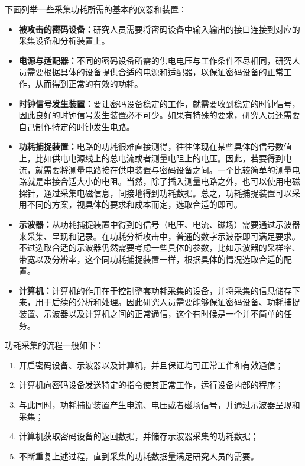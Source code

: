 下面列举一些采集功耗所需的基本的仪器和装置： \cite{paa_cn}

\begin{itemize}
\item \textbf{被攻击的密码设备：}研究人员需要将密码设备中输入输出的接口连接到对应的采集设备和分析装置上。
\item \textbf{电源与适配器：}不同的密码设备所需的供电电压与工作条件不尽相同，研究人员需要根据具体的设备提供合适的电源和适配器，以保证密码设备的正常工作，从而得到正常的有效的功耗。
\item \textbf{时钟信号发生装置：}要让密码设备稳定的工作，就需要收到稳定的时钟信号，因此良好的时钟信号发生装置必不可少。如果有特殊的要求，研究人员还需要自己制作特定的时钟发生电路。
\item \textbf{功耗捕捉装置：}电路的功耗很难直接测得，往往体现在某些具体的信号数值上，比如供电电源线上的总电流或者测量电阻上的电压。因此，若要得到电流，就需要将测量电路接在供电装置与密码设备之间。一个比较简单的测量电路就是串接合适大小的电阻。当然，除了插入测量电路之外，也可以使用电磁探针，通过采集电磁信息，间接地得到功耗数据。总之，功耗捕捉装置可以采用不同的方案，视具体的要求和成本而定，选取合适的即可。
\item \textbf{示波器：}从功耗捕捉装置中得到的信号（电压、电流、磁场）需要通过示波器来采集、呈现和记录。在功耗分析攻击中，普通的数字示波器即可满足要求。不过选取合适的示波器仍然需要考虑一些具体的参数，比如示波器的采样率、带宽以及分辨率，这个同功耗捕捉装置一样，根据具体的情况选取合适的配置。
\item \textbf{计算机：}计算机的作用在于控制整套功耗采集的设备，并将采集的信息储存下来，用于后续的分析和处理。因此研究人员需要能够保证密码设备、功耗捕捉装置、示波器以及计算机之间的正常通信，这个有时候是一个并不简单的任务。

\end{itemize}

\vspace*{0.5\baselineskip}

功耗采集的流程一般如下：

\begin{enumerate}
\item 开启密码设备、示波器以及计算机，并且保证均可正常工作和有效通信；
\item 计算机向密码设备发送特定的指令使其正常工作，运行设备内部的程序；
\item 与此同时，功耗捕捉装置产生电流、电压或者磁场信号，并通过示波器呈现和采集；
\item 计算机获取密码设备的返回数据，并储存示波器采集的功耗数据；
\item 不断重复上述过程，直到采集的功耗数据量满足研究人员的需要。

\end{enumerate}


